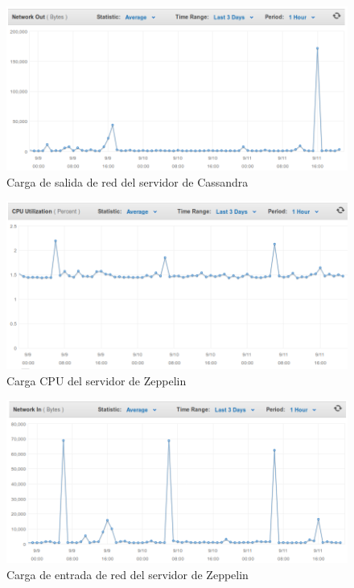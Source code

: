 \newpage

\begin{figure}[ht]
  \begin{center}
    \includegraphics[scale=0.40]{../images/amazon/netcassandraou.png}
    \caption{Carga de salida de red del servidor de Cassandra}
    \label{fig:paquetes}
  \end{center}
\end{figure}

\begin{figure}[ht]
  \begin{center}
    \includegraphics[scale=0.40]{../images/amazon/cpuzepp.png}
    \caption{Carga CPU del servidor de Zeppelin }
    \label{fig:paquetes}
  \end{center}
\end{figure}

\newpage

\begin{figure}[ht]
  \begin{center}
    \includegraphics[scale=0.40]{../images/amazon/netzepp.png}
    \caption{Carga de entrada de red del servidor de Zeppelin}
    \label{fig:paquetes}
  \end{center}
\end{figure}

